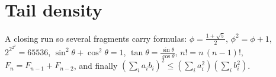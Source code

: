 \documentclass{article}
\begin{document}
\section{Tail density}

A closing run so several fragments carry formulas: $\phi = \frac{1+\sqrt{5}}{2}$,
$\phi^2 = \phi + 1$, $2^{2^{2^2}} = 65536$, $\sin^2\theta + \cos^2\theta = 1$,
$\tan\theta = \frac{\sin\theta}{\cos\theta}$, $n! = n\,(n-1)!$,
$F_n = F_{n-1} + F_{n-2}$, and finally
$\left(\sum_i a_i b_i\right)^2 \leq \left(\sum_i a_i^2\right)\left(\sum_i b_i^2\right)$.
\end{document}
